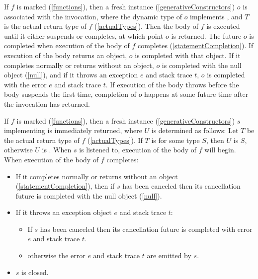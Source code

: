 \documentclass[makeidx]{article}
\begin{document}
{\LMHash{}%
If $f$ is marked \ASYNC{} (\ref{functions}),
then a fresh instance (\ref{generativeConstructors}) $o$
is associated with the invocation,
where the dynamic type of $o$ implements ,
and $T$ is the actual return type of $f$ (\ref{actualTypes}).
Then the body of $f$ is executed until it either suspends or completes,
at which point $o$ is returned.
The future $o$ is completed when execution of the body of $f$ completes
(\ref{statementCompletion}).
If execution of the body returns an object, $o$ is completed with that object.
If it completes normally or returns without an object,
$o$ is completed with the null object (\ref{null}),
and if it throws an exception $e$ and stack trace $t$,
$o$ is completed with the error $e$ and stack trace $t$.
If execution of the body throws before the body suspends the first time,
completion of $o$ happens at some future time after the invocation has returned.

\LMHash{}%
If $f$ is marked \code{\ASYNC*} (\ref{functions}),
then a fresh instance (\ref{generativeConstructors}) $s$
implementing  is immediately returned,
where $U$ is determined as follows:
Let $T$ be the actual return type of $f$ (\ref{actualTypes}).
If $T$ is  for some type $S$, then $U$ is $S$,
otherwise $U$ is .
When $s$ is listened to, execution of the body of $f$ will begin.
When execution of the body of $f$ completes:
\begin{itemize}
\item If it completes normally or returns without an object
  (\ref{statementCompletion}),
  then if $s$ has been canceled
  then its cancellation future is completed with the null object (\ref{null}).
\item If it throws an exception object $e$ and stack trace $t$:
  \begin{itemize}
  \item If $s$ has been canceled then its cancellation future is completed
    with error $e$ and stack trace $t$.
  \item otherwise the error $e$ and stack trace $t$ are emitted by $s$.
  \end{itemize}
\item $s$ is closed.
\end{itemize}

}
\end{document}
